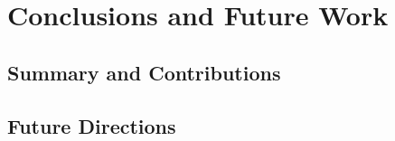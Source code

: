 ﻿\chapter{Conclusions and Future Work}

\section{Summary and Contributions}
\label{sec:conclusions}


\section{Future Directions}
\label{sec:future_work}

